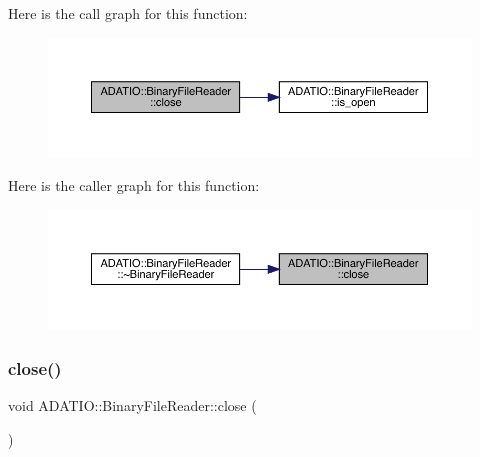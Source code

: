 Here is the call graph for this function\+:\nopagebreak
\begin{figure}[H]
\begin{center}
\leavevmode
\includegraphics[width=350pt]{df/d41/classADATIO_1_1BinaryFileReader_af0501cb948e5220209226970867dbb26_cgraph}
\end{center}
\end{figure}
Here is the caller graph for this function\+:\nopagebreak
\begin{figure}[H]
\begin{center}
\leavevmode
\includegraphics[width=350pt]{df/d41/classADATIO_1_1BinaryFileReader_af0501cb948e5220209226970867dbb26_icgraph}
\end{center}
\end{figure}
\mbox{\label{classADATIO_1_1BinaryFileReader_af0501cb948e5220209226970867dbb26}} 
\subsubsection{\texorpdfstring{close()}{close()}\hspace{0.1cm}{\footnotesize\ttfamily [2/2]}}
{\footnotesize\ttfamily void A\+D\+A\+T\+I\+O\+::\+Binary\+File\+Reader\+::close (\begin{DoxyParamCaption}{ }\end{DoxyParamCaption})}

\mbox{\label{classADATIO_1_1BinaryFileReader_addb0cfdf4c3df174327b1abc136cfc68}} 
